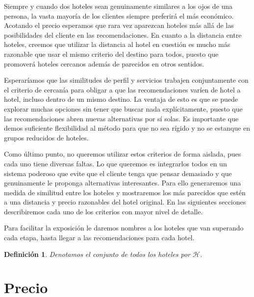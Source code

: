 \documentclass[12pt]{report}
\newtheorem{defn}{Definici\'on}[chapter]
\begin{document}
Siempre y cuando dos hoteles sean genuinamente similares a los ojos de una persona, la vasta mayoría de los clientes siempre preferirá el más económico. Acotando el precio esperamos que rara vez aparezcan hoteles más allá de las posibilidades del cliente en las recomendaciones. En cuanto a la distancia entre hoteles, creemos que utilizar la distancia al hotel en cuestión es mucho más razonable que usar el mismo criterio del destino para todos, puesto que promoverá hoteles cercanos además de parecidos en otros sentidos.

Esperaríamos que las similitudes de perfil y servicios trabajen conjuntamente con el criterio de cercanía para obligar a que las recomendaciones varíen de hotel a hotel, incluso dentro de un mismo destino. La ventaja de esto es que se puede explorar muchas opciones sin tener que buscar nada explícitamente, puesto que las recomendaciones abren nuevas alternativas por sí solas. Es importante que demos suficiente flexibilidad al método para que no sea rígido y no se estanque en grupos reducidos de hoteles.

Como último punto, no queremos utilizar estos criterios de forma aislada, pues cada uno tiene diversas faltas. Lo que queremos es integrarlos todos en un sistema poderoso que evite que el cliente tenga que pensar demasiado y que genuinamente le proponga alternativas interesantes. Para ello generaremos una medida de similitud entre los hoteles y mostraremos los más parecidos que estén a una distancia y precio razonables del hotel original. En las siguientes secciones describiremos cada uno de los criterios con mayor nivel de detalle.

Para facilitar la exposición le daremos nombres a los hoteles que van superando cada etapa, hasta llegar a las recomendaciones para cada hotel.
\begin{defn}
Denotamos el conjunto de todos los hoteles por $\mathcal{H}$.
\end{defn}

\section{Precio}
\end{document}
